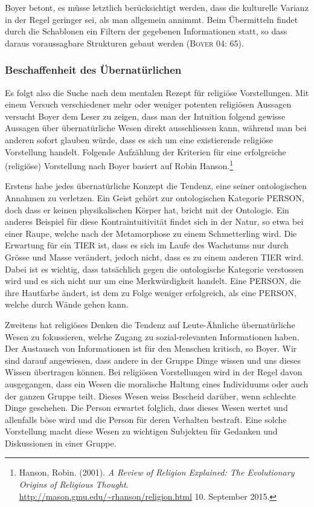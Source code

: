 Boyer betont, es müsse letztlich berücksichtigt werden, dass die kulturelle Varianz in der Regel geringer sei, als man allgemein annimmt. Beim Übermitteln findet durch die Schablonen ein Filtern der gegebenen Informationen statt, so dass daraus voraussagbare Strukturen gebaut werden (\textsc{Boyer 04: 65}).

\subsubsection{Beschaffenheit des Übernatürlichen}
Es folgt also die Suche nach dem mentalen Rezept für religiöse Vorstellung\-en. Mit einem Versuch verschiedener mehr oder weniger potenten religiösen Aussagen versucht Boyer dem Leser zu zeigen, dass man der Intuition folgend gewisse Aussagen über übernatürliche Wesen direkt ausschliessen kann, während man bei anderen sofort glauben würde, dass es sich um eine existierende religiöse Vorstellung handelt. Folgende Aufzählung der Kriterien für eine erfolgreiche (religiöse) Vorstellung nach Boyer basiert auf Robin Hanson.\footnote{Hanson, Robin. (2001). \emph{A Review of Religion Explained: The Evolutionary Origins of Religious Thought}. \\ \url{http://mason.gmu.edu/~rhanson/religion.html} 10. September 2015.} 

Erstens habe jedes übernatürliche Konzept die Tendenz, eine seiner ontologischen Annahmen zu verletzen. Ein Geist gehört zur ontologischen Kategorie PERSON, doch dass er keinen physikalischen Körper hat, bricht mit der Ontologie. Ein anderes Beispiel für diese Kontraintuitivität findet sich in der Natur, so etwa bei einer Raupe, welche nach der Metamorphose zu einem Schmetterling wird. Die Erwartung für ein TIER ist, dass es sich im Laufe des Wachstums nur durch Grösse und Masse verändert, jedoch nicht, dass es zu einem anderen TIER wird. Dabei ist es wichtig, dass tatsächlich gegen die ontologische Ka\-tegorie verstossen wird und es sich nicht nur um eine Merkwürdigkeit handelt. Eine PERSON, die ihre Hautfarbe ändert, ist dem zu Folge weniger erfolgreich, als eine PERSON, welche durch Wände gehen kann. 

Zweitens hat religiöses Denken die Tendenz auf Leute-Ähnliche übernatür\-liche Wesen zu fokussieren, welche Zugang zu sozial-relevanten Informationen haben. Der Austausch von Informationen ist für den Menschen kritisch, so \mbox{Boyer}. Wir sind darauf angewiesen, dass andere in der Gruppe Dinge wissen und uns dieses Wissen übertragen können. Bei religiösen Vorstellungen wird in der Regel davon ausgegangen, dass ein Wesen die moralische Haltung eines Individuums oder auch der ganzen Gruppe teilt. Dieses Wesen weiss Bescheid darüber, wenn schlechte Dinge geschehen. Die Person erwartet folglich, dass dieses Wesen wertet und allenfalls böse wird und die Person für deren Verhalten bestraft. Eine solche Vorstellung macht diese Wesen zu wichtigen Subjekten für Gedanken und Diskussionen in einer Gruppe. 

